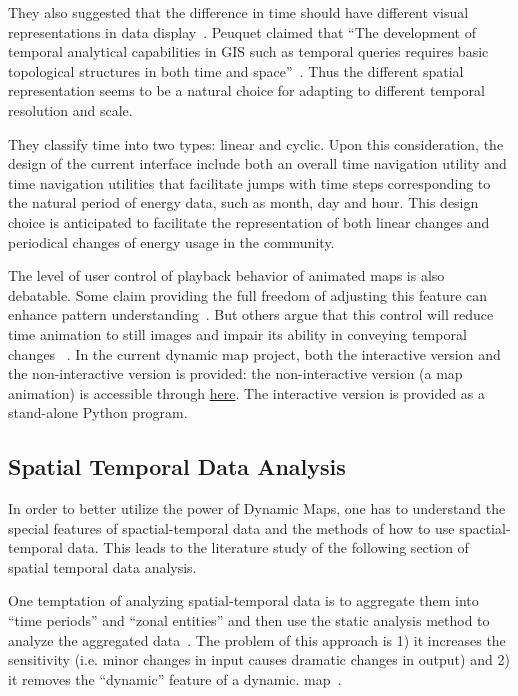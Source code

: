 They also suggested that the difference in time should have different
visual representations in data display~\cite{Harrower2008}. Peuquet
claimed that ``The development of temporal analytical capabilities in
GIS such as temporal queries requires basic topological structures in
both time and space''~\cite{Peuquet1994}. Thus the different spatial
representation seems to be a natural choice for adapting to different
temporal resolution and scale.

They classify time into two types: linear and cyclic. Upon this
consideration, the design of the current interface include both an
overall time navigation utility and time navigation utilities that
facilitate jumps with time steps corresponding to the natural period
of energy data, such as month, day and hour. This design choice
is anticipated to facilitate the representation of both linear changes
and periodical changes of energy usage in the community.

The level of user control of playback behavior of animated maps is
also debatable. Some claim providing the full freedom of adjusting
this feature can enhance pattern understanding~\cite{Nelson1998}. But
others argue that this control will reduce time animation to still
images and impair its ability in conveying temporal changes
~\cite{Lowe2004}. In the current dynamic map project, both the
interactive version and the non-interactive version is provided: the
non-interactive version (a map animation) is accessible through
\href{http://www.armechxyj.com/energy-mapping.html#redblueAnime3d}{here}. The
interactive version is provided as a stand-alone Python program.

\subsection{Spatial Temporal Data Analysis}\label{stDataAnalysis}
In order to better utilize the power of Dynamic Maps, one has to
understand the special features of spactial-temporal data and the
methods of how to use spactial-temporal data. This leads to the
literature study of the following section of spatial temporal data
analysis.

One temptation of analyzing spatial-temporal data is to aggregate them
into ``time periods'' and ``zonal entities'' and then use the static
analysis method to analyze the aggregated data~\cite{Dorling1992}. The
problem of this approach is 1) it increases the sensitivity
(i.e. minor changes in input causes dramatic changes in output) and 2)
it removes the ``dynamic'' feature of a dynamic.
map~\cite{Dorling1992}.

